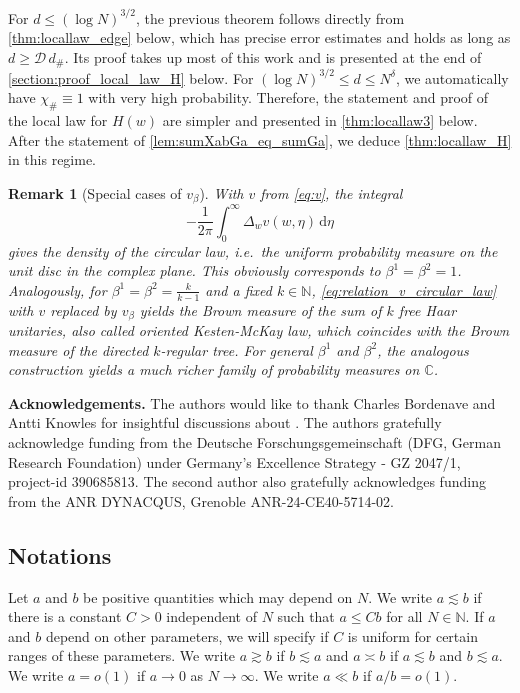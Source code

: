 \documentclass[10pt,a4paper]{amsart}
\newcommand{\C}{\mathbb{C}}
\newcommand{\N}{\mathbb{N}}
\newtheorem{remark}{Remark}[section]
\numberwithin{equation}{section}
\begin{document}
	
		For $d \leq (\log N)^{3/2}$, the previous theorem follows directly from \cref{thm:locallaw_edge} below, which has precise error estimates and holds as long as  $d \geq \mathcal D \, d_\#$. Its proof takes up most of this work and is presented at the end of \cref{section:proof_local_law_H} below. 
	For $(\log N)^{3/2}\leq d \leq N^\delta$, we automatically have $\chi_\# \equiv 1$ with very high probability. Therefore, the statement and proof of the local law for $H(w)$ are simpler and presented in \cref{thm:locallaw3} below. After the statement of \cref{lem:sumXabGa_eq_sumGa}, we deduce \cref{thm:locallaw_H} in this regime.
	

		\begin{remark}[Special cases of $v_{\beta}$] \label{rem:v_beta_measures} 
	With $v$ from \cref{eq:v}, the integral 
	\begin{equation} \label{eq:relation_v_circular_law} 
	-\frac{1}{2\pi} \int_0^\infty \Delta_w v(w,\eta) \, \mathrm{d} \eta
	\end{equation} 
     gives the density of the circular law, i.e.\ the uniform probability measure on the unit disc in the complex plane. This obviously corresponds to $\beta^1=\beta^2 = 1$. Analogously, for $\beta^1 = \beta^2 = \frac{k}{k-1}$
	and a fixed $k\in \N$, 
	\cref{eq:relation_v_circular_law} with $v$ replaced by $v_\beta$ yields the Brown measure of the sum of $k$ free Haar unitaries, 
	also called oriented Kesten-McKay law, which coincides with the Brown measure of the directed 
	$k$-regular tree. For general $\beta^1$ and $\beta^2$, the analogous construction yields a much richer family of probability measures on $\C$. 
	\end{remark} 
	

	\textbf{Acknowledgements.}
	The authors would like to thank Charles Bordenave and Antti Knowles for insightful discussions about \cite{BBK_spec_radii}.
	The authors gratefully acknowledge funding from the Deutsche Forschungsgemeinschaft (DFG, German Research Foundation) under Germany's Excellence Strategy - GZ 2047/1, project-id 390685813. The second author also gratefully acknowledges funding from the ANR DYNACQUS, Grenoble ANR-24-CE40-5714-02.
	
	\subsection{Notations}
	\label{sec:notation}

Let $a$ and $b$ be positive quantities which may depend on $N$. 
We write $a \lesssim b$ if there is a constant $C>0$ independent of $N$ such that $a \leq C b$ for all $N \in \N$. If $a$ and $b$ depend on other parameters, we will specify if $C$ is uniform for certain ranges of these parameters. 
	We write $a \gtrsim b$ if $b \lesssim a$ and $a \asymp b$ if $a\lesssim b$ and $b \lesssim a$. We write $a = o(1)$ if $a \to 0$ as $N \to \infty$. We write $a \ll b$ if $a/b =o(1)$.
	
\end{document}
